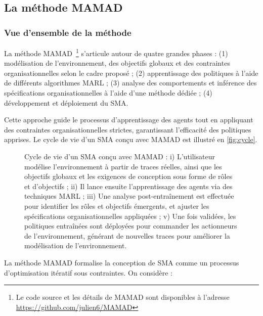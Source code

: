 \subsection{La méthode MAMAD}\label{sec:mamad}

\subsubsection{Vue d'ensemble de la méthode}

La méthode MAMAD~\footnote{Le code source et les détails de MAMAD sont disponibles à l'adresse \url{https://github.com/julien6/MAMAD}} s'articule autour de quatre grandes phases :  
(1) modélisation de l'environnement, des objectifs globaux et des contraintes organisationnelles selon le cadre proposé ;  
(2) apprentissage des politiques à l'aide de différents algorithmes MARL ;  
(3) analyse des comportements et inférence des spécifications organisationnelles à l'aide d'une méthode dédiée ;  
(4) développement et déploiement du SMA.  

Cette approche guide le processus d'apprentissage des agents tout en appliquant des contraintes organisationnelles strictes, garantissant l'efficacité des politiques apprises. Le cycle de vie d'un SMA conçu avec MAMAD est illustré en \autoref{fig:cycle}.

\begin{figure}[h!]
    \centering
    
    \caption{Cycle de vie d'un SMA conçu avec MAMAD :
        i) L'utilisateur modélise l'environnement à partir de traces réelles, ainsi que les objectifs globaux et les exigences de conception sous forme de rôles et d'objectifs ;  
        ii) Il lance ensuite l'apprentissage des agents via des techniques MARL ;  
        iii) Une analyse post-entraînement est effectuée pour identifier les rôles et objectifs émergents, et ajuster les spécifications organisationnelles appliquées ;  
        v) Une fois validées, les politiques entraînées sont déployées pour commander les actionneurs de l'environnement, générant de nouvelles traces pour améliorer la modélisation de l'environnement.
    }
    \label{fig:cycle}
\end{figure}

La méthode MAMAD formalise la conception de SMA comme un processus d'optimisation itératif sous contraintes. On considère :

